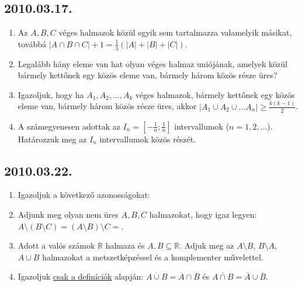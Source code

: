 \subsection*{2010.03.17.}
\begin{enumerate}
\item Az $A, B, C$ véges halmazok közül egyik sem tartalmazza valamelyik másikat, továbbá $|A\cap B\cap C|+1=\frac{1}{3}(|A|+|B|+|C|)$.
\item Legalább hány eleme van hat olyan véges halmaz uniójának, amelyek közül bármely kettőnek egy közös eleme van, bármely három közös része üres?
\item Igazoljuk, hogy ha $A_1, A_2, \ldots,A_k$ véges halmazok, bármely kettőnek egy közös eleme van, bármely három közös  része üres, akkor
$|A_1\cup A_2\cup \ldots A_n|\ge \frac{k(k-1)}{2}$.
\item A számegyenesen adottak az $I_n=\left[-\frac{1}{n};\frac{1}{n}\right]$ intervallumok ($n=1, 2,\ldots$). Határozzuk meg az $I_n$ intervallumok közös részét.
\end{enumerate}
\subsection*{2010.03.22.}
\begin{enumerate}
\item Igazoljuk a következő azonosságokat:
\item Adjunk meg olyan nem üres $A,B,C$ halmazokat, hogy igaz legyen: 
$A\setminus(B\setminus C)=(A\setminus B)\setminus C=$.
\item Adott a valós számok $\mathbb{R}$ halmaza és $A,B\subseteq \mathbb{R}$. Adjuk meg az $A\setminus B$, $B\setminus A$, $A\cup B$ halmazokat a metszetképzéssel és a komplementer művelettel.
\item Igazoljuk \underline{csak a definíciók} alapján:
$\overline{A\cup B}=\overline{A}\cap\overline{B}$ és
$\overline{A\cap B}=\overline{A}\cup\overline{B}$.

\end{enumerate}
